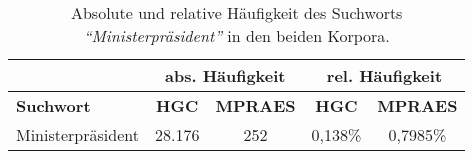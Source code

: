 \documentclass[%
	type=document,%
  	style=article,%
  	media=print,
  	pages=oneside,%
  	prefixLecturer=Dozenten:,
  	author=multiple,
]{unihildesheim} %
\begin{document}
\begin{table}[htpb]\label{t}
	\center
	\begin{tabularx}{0.8\textwidth}{lcccc}
		\toprule
		& \multicolumn{2}{c}{\textbf{abs. Häufigkeit}} &
		\multicolumn{2}{c}{\textbf{rel. Häufigkeit}} \\
		\midrule
		\textbf{Suchwort} & \textbf{HGC} & \textbf{MPRAES} & \textbf{HGC}
		&	\textbf{MPRAES} \\
		\midrule
		Ministerpräsident & 28.176 & 252 & 0,138\% & 0,7985\% \\
		\bottomrule
	\end{tabularx}
	\caption{Absolute und relative Häufigkeit des Suchworts \textit{"`Ministerpräsident"'} in
	den beiden Korpora.}
	\label{tab:corp_frequency}
\end{table}
\end{document}
